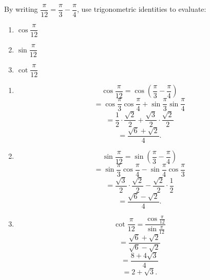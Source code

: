 By writing $\dfrac{\pi}{12} = \dfrac{\pi}{3}- \dfrac{\pi}{4}$, use trigonometric identities to evaluate:
\begin{enumerate}
\item
$\cos \dfrac{\pi}{12}$
\item
$\sin \dfrac{\pi}{12}$
\item
$\cot \dfrac{\pi}{12}$
\end{enumerate}
\begin{enumerate}
\item
\[
\cos\frac{\pi}{12} = \cos\left(\frac{\pi}{3}-\frac{\pi}{4}\right)
\]
\[
=\cos\frac{\pi}{3}\cos\frac{\pi}{4}+\sin\frac{\pi}{3}\sin\frac{\pi}{4}
\]
\[
= \frac{1}{2}\cdot\frac{\sqrt{2}}{2}+\frac{\sqrt{3}}{2}\cdot\frac{\sqrt{2}}{2}
\]
\[
=\frac{\sqrt{6}+\sqrt{2}}{4}.
\]
\item
\[
\sin\frac{\pi}{12} = \sin\left(\frac{\pi}{3}-\frac{\pi}{4}\right)
\]
\[
=\sin\frac{\pi}{3}\cos\frac{\pi}{4} - \sin\frac{\pi}{4}\cos\frac{\pi}{3}
\]
\[
=\frac{\sqrt{3}}{2}\cdot\frac{\sqrt{2}}{2}-\frac{\sqrt{2}}{2}\cdot\frac{1}{2}
\]
\[
= \frac{\sqrt{6}-\sqrt{2}}{4}.
\]
\item
\[
\cot\frac{\pi}{12} = \frac{\cos\frac{\pi}{12}}{\sin\frac{\pi}{12}}
\]
\[
= \frac{\sqrt{6}+\sqrt{2}}{\sqrt{6}-\sqrt{2}}
\]
\[
= \frac{8+4\sqrt{3}}{4}
\]
\[
= 2 + \sqrt{3}.
\]
\end{enumerate}
